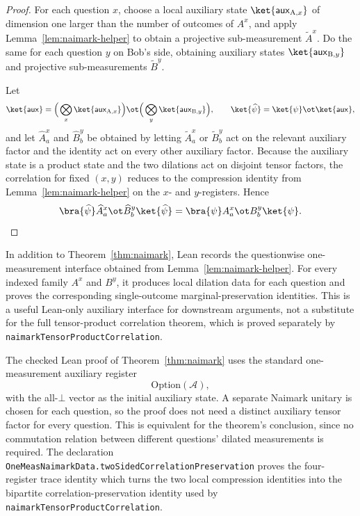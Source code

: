 \begin{proof}
	\leanok

	For each question $x$, choose a local auxiliary state
	$\ket{\mathsf{aux}_{\mathrm A,x}}$ of dimension one larger than the number of
	outcomes of $A^x$, and apply Lemma~\ref{lem:naimark-helper} to obtain a
	projective sub-measurement $\widetilde A^x$. Do the same for each question $y$
	on Bob's side, obtaining auxiliary states $\ket{\mathsf{aux}_{\mathrm B,y}}$
	and projective sub-measurements $\widetilde B^y$.

	Let
	\[
		\ket{\mathsf{aux}}
		=
		\Big(\bigotimes_x \ket{\mathsf{aux}_{\mathrm A,x}}\Big)
		\ot
		\Big(\bigotimes_y \ket{\mathsf{aux}_{\mathrm B,y}}\Big),
		\qquad
		\ket{\widehat{\psi}} = \ket{\psi} \ot \ket{\mathsf{aux}},
	\]
	and let $\widehat A^x_a$ and $\widehat B^y_b$ be obtained by letting
	$\widetilde A^x_a$ or $\widetilde B^y_b$ act on the relevant auxiliary factor
	and the identity act on every other auxiliary factor. Because the auxiliary
	state is a product state and the two dilations act on disjoint tensor factors,
	the correlation for fixed $(x,y)$ reduces to the compression identity from
	Lemma~\ref{lem:naimark-helper} on the $x$- and $y$-registers. Hence
	\[
		\bra{\widehat{\psi}} \widehat A^x_a \ot \widehat B^y_b \ket{\widehat{\psi}}
		=
		\bra{\psi} A^x_a \ot B^y_b \ket{\psi}.
	\]
\end{proof}

\begin{remark}\label{rem:lean-questionwise-naimark}
	In addition to Theorem~\ref{thm:naimark}, Lean records the questionwise
	one-measurement interface obtained from Lemma~\ref{lem:naimark-helper}.  For
	every indexed family \(A^x\) and \(B^y\), it produces local dilation data for
	each question and proves the corresponding single-outcome
	marginal-preservation identities.  This is a useful Lean-only auxiliary
	interface for downstream arguments, not a substitute for the full
	tensor-product correlation theorem, which is proved separately by
	\texttt{naimarkTensorProductCorrelation}.
\end{remark}

\begin{remark}\label{rem:lean-naimark-auxiliary-declarations}
	The checked Lean proof of Theorem~\ref{thm:naimark} uses the standard
	one-measurement auxiliary register
	\[
		\mathrm{Option}(\mathcal A),
	\]
	with the all-\(\bot\) vector as the initial auxiliary state.  A separate
	Naimark unitary is chosen for each question, so the proof does not need a
	distinct auxiliary tensor factor for every question.  This is equivalent for
	the theorem's conclusion, since no commutation relation between different
	questions' dilated measurements is required.  The declaration
	\texttt{OneMeasNaimarkData.twoSidedCorrelationPreservation} proves the
	four-register trace identity which turns the two local compression identities
	into the bipartite correlation-preservation identity used by
	\texttt{naimarkTensorProductCorrelation}.
\end{remark}

